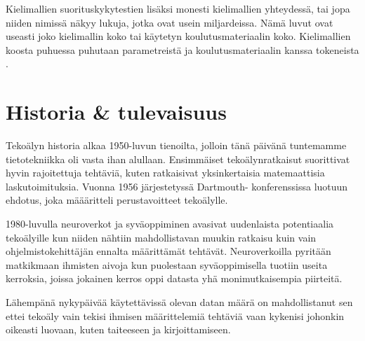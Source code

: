 Kielimallien suorituskykytestien lisäksi monesti kielimallien yhteydessä, tai
jopa niiden nimissä näkyy lukuja, jotka ovat usein miljardeissa. Nämä luvut
ovat useasti joko kielimallin koko tai käytetyn koulutusmateriaalin koko.
Kielimallien koosta puhuessa puhutaan parametreistä ja koulutusmateriaalin
kanssa tokeneista \parencite{kaplan2020scalinglawsneurallanguage}.

\section{Historia \& tulevaisuus}

Tekoälyn historia alkaa 1950-luvun tienoilta, jolloin tänä päivänä tuntemamme
tietotekniikka oli vasta ihan alullaan. Ensimmäiset tekoälynratkaisut
suorittivat hyvin rajoitettuja tehtäviä, kuten ratkaisivat yksinkertaisia
matemaattisia laskutoimituksia. Vuonna 1956 järjestetyssä Dartmouth-
konferenssissa luotuun ehdotus, joka määäritteli perustavoitteet tekoälylle.
\parencite{alma9911564814005973}

1980-luvulla neuroverkot ja syväoppiminen avasivat uudenlaista potentiaalia
tekoälyille kun niiden nähtiin mahdollistavan muukin ratkaisu kuin vain
ohjelmistokehittäjän ennalta määrittämät tehtävät. Neuroverkoilla pyritään
matkikmaan ihmisten aivoja kun puolestaan syväoppimisella tuotiin useita
kerroksia, joissa jokainen kerros oppi datasta yhä monimutkaisempia piirteitä.
\parencite{alma9911564814005973}

Lähempänä nykypäivää käytettävissä olevan datan määrä on mahdollistanut sen
ettei tekoäly vain tekisi ihmisen määrittelemiä tehtäviä vaan kykenisi johonkin
oikeasti luovaan, kuten taiteeseen ja kirjoittamiseen.
\parencite{alma9911564814005973}
